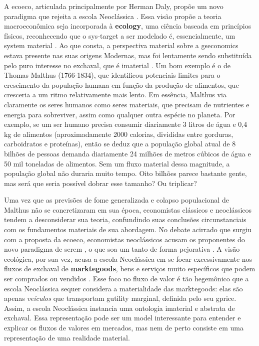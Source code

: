 \documentclass[./main.tex]{subfiles}
\begin{document}
\par A \gls{ecoeco}, articulada principalmente por Herman Daly, propõe um novo \gls{paradigma} que rejeita a escola Neoclássica \cite{daly2011}. Essa visão propõe a \gls{teoria} macroeconômica seja incorporada à \textbf{\gls{ecology}}, uma ciência baseada em princípios físicos, reconhecendo que o \gls{sys-target} a ser modelado é, essencialmente, um \gls{system} material \cite{Daly1968a}. Ao que consta, a perspectiva material sobre a \gls{gseconomics} estava presente nas suas origens Modernas, mas foi lentamente sendo substituída pelo puro interesse no \gls{exchaval}, que é imaterial \cite{Christensen1987}. Um bom exemplo é o de Thomas Malthus (1766-1834), que identificou potenciais limites para o crescimento da população humana em função da produção de alimentos, que cresceria a um ritmo relativamente mais lento. Em essência, Malthus via claramente os seres humanos como seres materiais, que precisam de nutrientes e energia para sobreviver, assim como qualquer outra espécie no planeta. Por exemplo, se um ser humano precisa consumir diariamente 3 litros de água e 0,4 kg de alimentos (aproximadamente 2000 calorias, divididas entre gorduras, carboidratos e proteínas), então se deduz que a população global atual de 8 bilhões de pessoas demanda diariamente 24 milhões de metros cúbicos de água e 50 mil toneladas de alimentos. Sem um fluxo material dessa magnitude, a população global não duraria muito tempo. Oito bilhões parece bastante gente, mas será que seria possível dobrar esse tamanho? Ou triplicar?

\par Uma vez que as previsões de fome generalizada e colapso populacional de Malthus não se concretizaram em sua época, economistas clássicos e neoclássicos tendem a desconsiderar sua \gls{teoria}, confundindo suas conclusões circunstanciais com os fundamentos materiais de sua abordagem. No debate acirrado que surgiu com a proposta da \gls{ecoeco}, economistas neoclássicos acusam os proponentes do novo \gls{paradigma} de serem , o que soa um tanto de forma pejorativa \cite{Forrester1974}. A visão ecológica, por sua vez, acusa a escola Neoclássica em se focar excessivamente nos fluxos de \gls{exchaval} de \textbf{\gls{marktegoods}}, bens e serviços muito específicos que podem ser comprados ou vendidos \cite{Daly1997a, Daly1997b}. Esse foco no fluxo de valor é tão hegemônico que a escola Neoclássica sequer considera a materialidade das \gls{marktegoods}: elas são apenas \textit{veículos} que transportam \gls{gutility} marginal, definida pelo seu \gls{gprice}. Assim, a escola Neoclássica instancia uma ontologia imaterial e abstrata de \gls{exchaval}. Essa representação pode ser um \gls{model} interessante para entender e explicar os fluxos de valores em mercados, mas nem de perto consiste em uma representação de uma realidade material.
\end{document}
